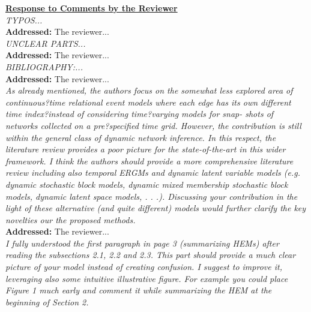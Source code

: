 \documentclass[12pt]{article}
\newcommand{\grey}[1]{{\color{mygrey}#1}}
\theoremstyle{definition}
\begin{document}
\noindent \underline{\textbf{Response to Comments by the Reviewer}}\\

 \grey{\emph{ TYPOS...}}\\

\noindent \textcolor{MyGreen}{\textbf{Addressed:}} The reviewer... \\

 \grey{\emph{UNCLEAR PARTS...}}\\

\noindent \textcolor{MyGreen}{\textbf{Addressed:}} The reviewer... \\


 \grey{\emph{BIBLIOGRAPHY:...}}\\

\noindent \textcolor{MyGreen}{\textbf{Addressed:}} The reviewer... \\


 \grey{\emph{As already mentioned, the authors focus on the somewhat less explored area of continuous?time relational event models where each edge has its own different time index?instead of considering time?varying models for snap- shots of networks collected on a pre?specified time grid. However, the contribution is still within the general class of dynamic network inference. In this respect, the literature review provides a poor picture for the state-of-the-art in this wider framework. I think the authors should provide a more comprehensive literature review including also temporal ERGMs and dynamic latent variable models (e.g. dynamic stochastic block models, dynamic mixed membership stochastic block models, dynamic latent space models, . . .). Discussing your contribution in the light of these alternative (and quite different) models would further clarify the key novelties our the proposed methods.}}\\

\noindent \textcolor{MyGreen}{\textbf{Addressed:}} The reviewer... \\

 \grey{\emph{I fully understood the first paragraph in page 3 (summarizing HEMs) after reading the subsections 2.1, 2.2 and 2.3. This part should provide a much clear picture of your model instead of creating confusion. I suggest to improve it, leveraging also some intuitive illustrative figure. For example you could place Figure 1 much early and comment it while summarizing the HEM at the beginning of Section 2.}}\\
\end{document}
